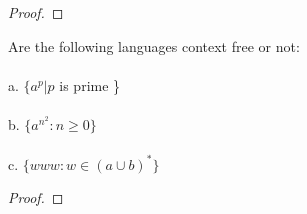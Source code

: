 \documentclass[12pt]{article}
\newenvironment{exercise}[2][Exercise]{\begin{trivlist}
\item[\hskip \labelsep {\bfseries #1}\hskip \labelsep {\bfseries #2.}]}{\end{trivlist}}
\begin{document}
\begin{proof}

\end{proof}

\begin{exercise}{5}
Are the following languages context free or not: \\ \\ 
a. $\{a^{p} | p$ is prime \} \\ \\ 
b. $\{a^{n^{2}} : n \geq 0\}$ \\ \\
c. $\{www: w \in (a \cup b)^{*} \}$
\end{exercise}

\begin{proof}

\end{proof}
\end{document}
